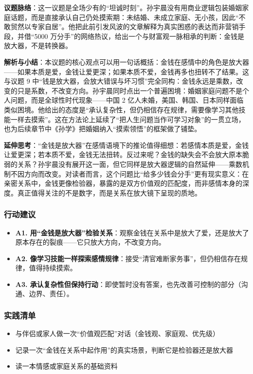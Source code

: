 \textbf{议题脉络}：这一议题是全场少有的``坦诚时刻''。孙宇晨没有用商业逻辑包装婚姻家庭话题，而是直接承认自己仍处摸索期：未结婚、未成立家庭、无小孩，因此``不敢贸然以专家自居''。他把此前引发风波的文章解释为真实困惑的表达而非营销手段，并借``5000
万分手''的网络热议，给出一个与财富观一脉相承的判断：金钱是放大器，不是转换器。

\textbf{解析与小结}：本议题的核心观点可以用一句话概括：金钱在感情中的角色是放大器------如果本质是爱，金钱让爱更深；如果本质不爱，金钱再多也扭转不了结果。这与议题
9
中``钱是放大器，会放大错误与坏习惯''完全同构：金钱永远是乘数，改变的只是系数，不改变方向。孙宇晨同时点出一个普遍困境：婚姻家庭问题不是个人问题，而是全球性时代现象------中国
2
亿人未婚，美国、韩国、日本同样面临类似困境。他给出的态度是``承认复杂性，但仍相信存在规律，需要像学习其他技能一样去摸索''。这在方法论上延续了``把人生问题当作可学习对象''的一贯立场，也为后续章节中《孙学》把婚姻纳入``摸索领悟''的框架做了铺垫。

\textbf{延伸思考}：``金钱是放大器''在感情语境下的推论值得细想：若感情本质是爱，金钱让爱更深；若本质不爱，金钱无法扭转。反过来呢？金钱的缺失会不会放大原本脆弱的关系？孙宇晨没有展开这一面，但它同样是放大器逻辑的自然延伸------乘数机制不因方向而改变。对读者而言，这个问题比``给多少钱会分手''更有现实意义：在亲密关系中，金钱更像检验器，暴露的是双方价值观的匹配度，而非感情本身的深度。真正值得关注的不是数字，而是关系在放大镜下呈现的质地。

\subsubsection{行动建议}

\begin{itemize}
\tightlist
\item
  \textbf{A1.
  用``金钱是放大器''检验关系}：观察金钱在关系中是放大了爱，还是放大了原本存在的裂痕------它只放大方向，不改变方向。
\item
  \textbf{A2.
  像学习技能一样探索感情规律}：接受``清官难断家务事''，但仍相信存在规律，值得持续摸索。
\item
  \textbf{A3.
  承认复杂性但保持行动}：即使暂时没有答案，也先改善可控制的部分（沟通、边界、责任）。
\end{itemize}

\subsubsection{实践清单}

\begin{itemize}
\tightlist
\item[$\square$]
  与伴侣或家人做一次``价值观匹配''对话（金钱观、家庭观、优先级）
\item[$\square$]
  记录一次``金钱在关系中起作用''的真实场景，判断它是检验器还是放大器
\item[$\square$]
  读一本情感或家庭关系的基础资料
\end{itemize}

